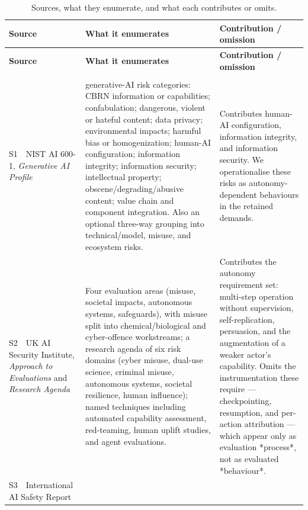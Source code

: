 \documentclass{article} %
\begin{document}
	\begingroup
	\footnotesize
	\begin{longtable}{@{}>{\raggedright\arraybackslash}p{}>{\raggedright\arraybackslash}p{}>{\raggedright\arraybackslash}p{}@{}}
		\caption{Sources, what they enumerate, and what each contributes or omits.}
		\label{tab:sources}\\
		\toprule
		\textbf{Source} & \textbf{What it enumerates} & \textbf{Contribution / omission} \\
		\midrule
		\endfirsthead
		\toprule
		\textbf{Source} & \textbf{What it enumerates} & \textbf{Contribution / omission} \\
		\midrule
		\endhead
		\midrule
		\multicolumn{3}{r}{\emph{Continued on next page}}\\
		\endfoot
		\bottomrule
		\endlastfoot
		S1~~NIST AI 600-1, \emph{Generative AI Profile}~\citep{nist-genai-profile}
		& 12 generative-AI risk categories: CBRN information or capabilities; confabulation; dangerous, violent or hateful content; data privacy; environmental impacts; harmful bias or homogenization; human-AI configuration; information integrity; information security; intellectual property; obscene/degrading/abusive content; value chain and component integration. Also an optional three-way grouping into technical/model, misuse, and ecosystem risks.
		& Contributes human-AI configuration, information integrity, and information security. We operationalise these risks as autonomy-dependent behaviours in the retained demands. \\
		S2~~UK AI Security Institute, \emph{Approach to Evaluations} and \emph{Research Agenda}~\citep{uk-aisi-approach-evaluations}
		& Four evaluation areas (misuse, societal impacts, autonomous systems, safeguards), with misuse split into chemical/biological and cyber-offence workstreams; a research agenda of six risk domains (cyber misuse, dual-use science, criminal misuse, autonomous systems, societal resilience, human influence); named techniques including automated capability assessment, red-teaming, human uplift studies, and agent evaluations.
		& Contributes the autonomy requirement set: multi-step operation without supervision, self-replication, persuasion, and the augmentation of a weaker actor's capability. Omits the instrumentation these require --- checkpointing, resumption, and per-action attribution --- which appear only as evaluation *process*, not as evaluated *behaviour*. \\
		S3~~International AI Safety Report~\citep{iasr2025}

\end{longtable}
\end{document}
